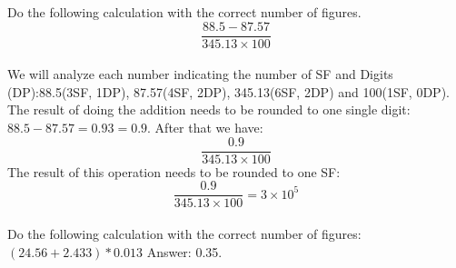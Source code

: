 \documentclass[main.tex]{subfiles}
\begin{document}
\begin{description}
\begin{example} %
Do the following calculation with the correct number of figures.
\begin{equation*}
\dfrac{88.5-87.57}{345.13\times100}
\end{equation*}
\\
We will analyze each number indicating the number of SF and Digits (DP):88.5(3SF, 1DP), 87.57(4SF, 2DP),  345.13(6SF, 2DP) and  100(1SF, 0DP). The result of doing the addition needs to be rounded to one single digit: $88.5-87.57=0.93=0.9$. After that we have:
\begin{equation*}
\dfrac{0.9}{345.13\times100}
\end{equation*}
The result of this operation needs to be rounded to one SF:
\begin{equation*}
\dfrac{0.9}{345.13\times100}=3\times 10^5
\end{equation*}
\faDiamond\ \\
Do the following calculation with the correct number of figures: $(24.56+2.433)*0.013$
\flushright Answer: 0.35.
\end{example}%





\end{description}
\end{document}
